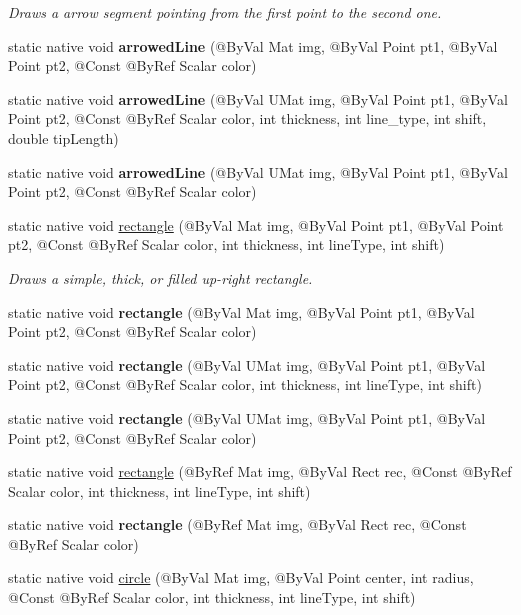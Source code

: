 \begin{DoxyCompactItemize}
\begin{DoxyCompactList}\small\item\em Draws a arrow segment pointing from the first point to the second one. \end{DoxyCompactList}\item 
static native void {\bfseries arrowed\+Line} (@By\+Val Mat img, @By\+Val Point pt1, @By\+Val Point pt2, @Const @By\+Ref Scalar color)
\item 
static native void {\bfseries arrowed\+Line} (@By\+Val U\+Mat img, @By\+Val Point pt1, @By\+Val Point pt2, @Const @By\+Ref Scalar color, int thickness, int line\+\_\+type, int shift, double tip\+Length)
\item 
static native void {\bfseries arrowed\+Line} (@By\+Val U\+Mat img, @By\+Val Point pt1, @By\+Val Point pt2, @Const @By\+Ref Scalar color)
\item 
static native void \hyperlink{group__imgproc__draw_ga011e780e69d07eab5e5e6ac46d4d8dde}{rectangle} (@By\+Val Mat img, @By\+Val Point pt1, @By\+Val Point pt2, @Const @By\+Ref Scalar color, int thickness, int line\+Type, int shift)
\begin{DoxyCompactList}\small\item\em Draws a simple, thick, or filled up-\/right rectangle. \end{DoxyCompactList}\item 
static native void {\bfseries rectangle} (@By\+Val Mat img, @By\+Val Point pt1, @By\+Val Point pt2, @Const @By\+Ref Scalar color)
\item 
static native void {\bfseries rectangle} (@By\+Val U\+Mat img, @By\+Val Point pt1, @By\+Val Point pt2, @Const @By\+Ref Scalar color, int thickness, int line\+Type, int shift)
\item 
static native void {\bfseries rectangle} (@By\+Val U\+Mat img, @By\+Val Point pt1, @By\+Val Point pt2, @Const @By\+Ref Scalar color)
\item 
static native void \hyperlink{group__imgproc__draw_ga35715bd59f4d006c97366b20cdc4499e}{rectangle} (@By\+Ref Mat img, @By\+Val Rect rec, @Const @By\+Ref Scalar color, int thickness, int line\+Type, int shift)
\item 
static native void {\bfseries rectangle} (@By\+Ref Mat img, @By\+Val Rect rec, @Const @By\+Ref Scalar color)
\item 
static native void \hyperlink{group__imgproc__draw_ga6f8e5000cb25b63d5885b12d46f52e39}{circle} (@By\+Val Mat img, @By\+Val Point center, int radius, @Const @By\+Ref Scalar color, int thickness, int line\+Type, int shift)

\end{DoxyCompactItemize}
